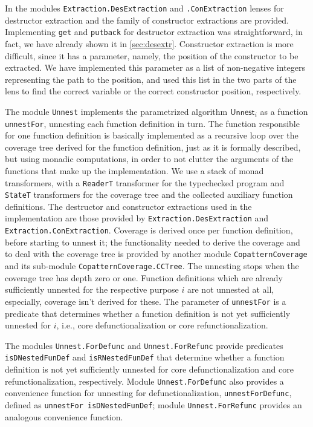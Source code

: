 In the modules \texttt{Extraction.DesExtraction} and \texttt{.ConExtraction} lenses for  destructor extraction and the family of constructor extractions are provided. Implementing \texttt{get} and \texttt{putback} for destructor extraction was straightforward, in fact, we have already shown it in \autoref{sec:desextr}. Constructor extraction is more difficult, since it has a parameter, namely, the position of the constructor to be extracted. We have implemented this parameter as a list of non-negative integers representing the path to the position, and used this list in the two parts of the lens to find the correct variable or the correct constructor position, respectively.

The module \texttt{Unnest} implements the parametrized algorithm $\textsf{Unnest}_i$ as a function \texttt{unnestFor}, unnesting each function definition in turn. The function responsible for one function definition is basically implemented as a recursive loop over the coverage tree derived for the function definition, just as it is formally described, but using monadic computations, in order to not clutter the arguments of the functions that make up the implementation. We use a stack of monad transformers, with a \texttt{ReaderT} transformer for the typechecked program and \texttt{StateT} transformers for the coverage tree and the collected auxiliary function definitions. The destructor and constructor extractions used in the implementation are those provided by \texttt{Extraction.DesExtraction} and \texttt{Extraction.ConExtraction}. Coverage is derived once per function definition, before starting to unnest it; the functionality needed to derive the coverage and to deal with the coverage tree is provided by another module \texttt{CopatternCoverage} and its sub-module \texttt{CopatternCoverage.CCTree}. The unnesting stops when the coverage tree has depth zero or one. Function definitions which are already sufficiently unnested for the respective purpose $i$ are not unnested at all, especially, coverage isn't derived for these. The parameter of \texttt{unnestFor} is a predicate that determines whether a function definition is not yet sufficiently unnested for $i$, i.e., core defunctionalization or core refunctionalization.

The modules \texttt{Unnest.ForDefunc} and \texttt{Unnest.ForRefunc} provide predicates \texttt{isDNestedFunDef} and \texttt{isRNestedFunDef} that determine whether a function definition is not yet sufficiently unnested for core defunctionalization and core refunctionalization, respectively. Module \texttt{Unnest.ForDefunc} also provides a convenience function for unnesting for defunctionalization, \texttt{unnestForDefunc}, defined as \texttt{unnestFor isDNestedFunDef}; module \texttt{Unnest.ForRefunc} provides an analogous convenience function.

